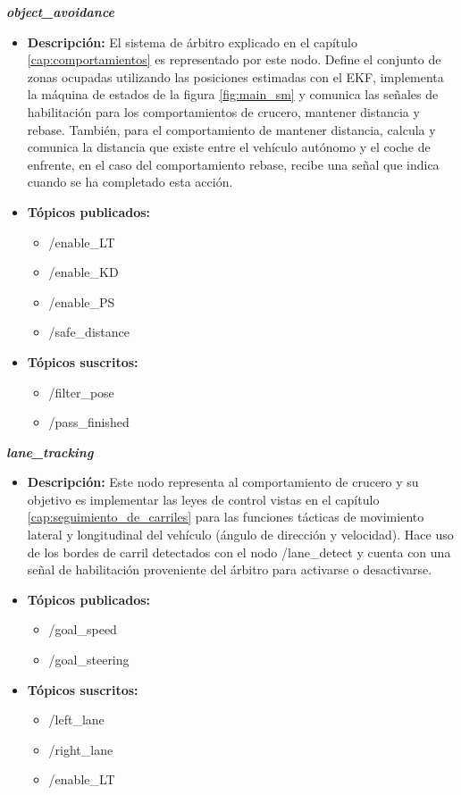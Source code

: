 \textbf{\textit{object\_avoidance}}
\begin{itemize}
    \item \textbf{Descripción:} El sistema de árbitro explicado en el capítulo \ref{cap:comportamientos} es representado por este nodo. Define el conjunto de zonas ocupadas utilizando las posiciones estimadas con el EKF, implementa la máquina de estados de la figura \ref{fig:main_sm} y comunica las señales de habilitación para los comportamientos de crucero, mantener distancia y rebase. También, para el comportamiento de mantener distancia, calcula y comunica la distancia que existe entre el vehículo autónomo y el coche de enfrente, en el caso del comportamiento rebase, recibe una señal que indica cuando se ha completado esta acción.
    \item \textbf{Tópicos publicados:} 
    \begin{itemize}
        \item /enable\_LT
        \item /enable\_KD
        \item /enable\_PS
        \item /safe\_distance
    \end{itemize}
    \item \textbf{Tópicos suscritos:}
    \begin{itemize}
        \item /filter\_pose
        \item /pass\_finished
    \end{itemize}
\end{itemize}

\newpage
\textbf{\textit{lane\_tracking}}
\begin{itemize}
    \item \textbf{Descripción:} Este nodo representa al comportamiento de crucero y su objetivo es implementar las leyes de control vistas en el capítulo \ref{cap:seguimiento_de_carriles} para las funciones tácticas de movimiento lateral y longitudinal del vehículo (ángulo de dirección y velocidad). Hace uso de los bordes de carril detectados con el nodo /lane\_detect y cuenta con una señal de habilitación proveniente del árbitro para activarse o desactivarse.
    \item \textbf{Tópicos publicados:}
    \begin{itemize}
        \item /goal\_speed
        \item /goal\_steering
    \end{itemize}
    \item \textbf{Tópicos suscritos:}
    \begin{itemize}
        \item /left\_lane
        \item /right\_lane
        \item /enable\_LT
    \end{itemize}
\end{itemize}
\hfill

